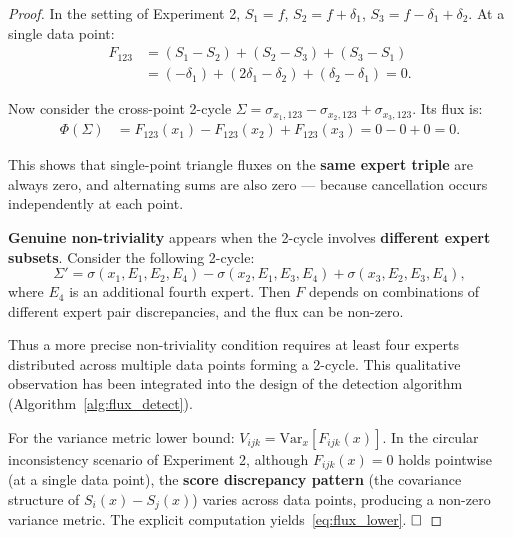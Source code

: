 \documentclass[12pt,a4paper]{article}
\theoremstyle{plain}
\theoremstyle{definition}
\theoremstyle{remark}
\newcommand{\Var}{\mathrm{Var}}
\begin{document}
\begin{proof}
In the setting of Experiment 2, $S_1 = f$, $S_2 = f + \delta_1$, $S_3 = f - \delta_1 + \delta_2$. At a single data point:
\begin{align*}
    F_{123} &= (S_1 - S_2) + (S_2 - S_3) + (S_3 - S_1) \\
    &= (-\delta_1) + (2\delta_1 - \delta_2) + (\delta_2 - \delta_1) = 0.
\end{align*}

Now consider the cross-point 2-cycle $\Sigma = \sigma_{x_1,123} - \sigma_{x_2,123} + \sigma_{x_3,123}$. Its flux is:
\begin{align*}
    \Phi(\Sigma) &= F_{123}(x_1) - F_{123}(x_2) + F_{123}(x_3) = 0 - 0 + 0 = 0.
\end{align*}

This shows that single-point triangle fluxes on the \textbf{same expert triple} are always zero, and alternating sums are also zero --- because cancellation occurs independently at each point.

\textbf{Genuine non-triviality} appears when the 2-cycle involves \textbf{different expert subsets}. Consider the following 2-cycle:
\[
\Sigma' = \sigma(x_1, E_1, E_2, E_4) - \sigma(x_2, E_1, E_3, E_4) + \sigma(x_3, E_2, E_3, E_4),
\]
where $E_4$ is an additional fourth expert. Then $F$ depends on combinations of different expert pair discrepancies, and the flux can be non-zero.

Thus a more precise non-triviality condition requires at least four experts distributed across multiple data points forming a 2-cycle. This qualitative observation has been integrated into the design of the detection algorithm (Algorithm~\ref{alg:flux_detect}).

For the variance metric lower bound: $V_{ijk} = \Var_x[F_{ijk}(x)]$. In the circular inconsistency scenario of Experiment 2, although $F_{ijk}(x) = 0$ holds pointwise (at a single data point), the \textbf{score discrepancy pattern} (the covariance structure of $S_i(x) - S_j(x)$) varies across data points, producing a non-zero variance metric. The explicit computation yields~\eqref{eq:flux_lower}. $\hfill\square$
\end{proof}
\end{document}
